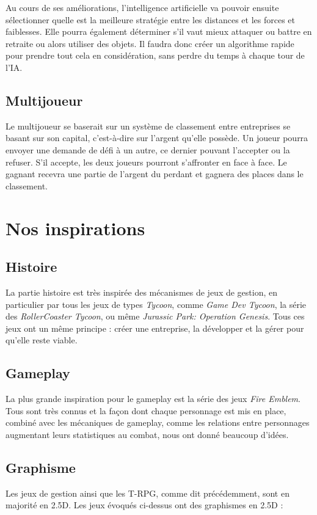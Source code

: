 \documentclass{article}
\begin{document}
Au cours de ses améliorations, l'intelligence artificielle va pouvoir ensuite sélectionner quelle est la meilleure stratégie entre les distances et les forces et faiblesses. Elle pourra également déterminer s'il vaut mieux attaquer ou battre en retraite ou alors utiliser des objets.
Il faudra donc créer un algorithme rapide pour prendre tout cela en considération, sans perdre du temps à chaque tour de l'IA.


\subsection{Multijoueur}
Le multijoueur se baserait sur un système de classement entre entreprises se basant sur son capital, c'est-à-dire sur l'argent qu'elle possède. Un joueur pourra envoyer une demande de défi à un autre, ce dernier pouvant l'accepter ou la refuser. S'il accepte, les deux joueurs pourront s'affronter en face à face.	Le gagnant recevra une partie de l'argent du perdant et gagnera des places dans le classement.

\section{Nos inspirations}
\subsection{Histoire}
La partie histoire est très inspirée des mécanismes de jeux de gestion, en particulier par tous les jeux de types \textit{Tycoon}, comme \textit{Game Dev Tycoon}, la série des \textit{RollerCoaster Tycoon}, ou même \textit{Jurassic Park: Operation Genesis}. Tous ces jeux ont un même principe : créer une entreprise, la développer et la gérer pour qu'elle reste viable.

\subsection{Gameplay}
La plus grande inspiration pour le gameplay est la série des jeux \textit{Fire Emblem}. Tous sont très connus et la façon dont chaque personnage est mis en place, combiné avec les mécaniques de gameplay, comme les relations entre personnages augmentant leurs statistiques au combat, nous ont donné beaucoup d'idées.

\subsection{Graphisme}
Les jeux de gestion ainsi que les T-RPG, comme dit précédemment, sont en majorité en 2.5D. Les jeux évoqués ci-dessus ont des graphismes en 2.5D :
\end{document}

